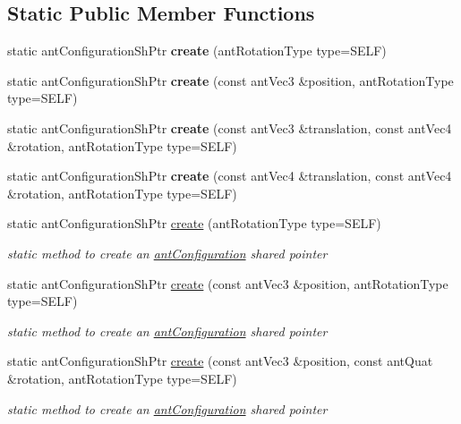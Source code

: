 \subsection*{Static Public Member Functions}
\begin{DoxyCompactItemize}
\item 
\hypertarget{classant_configuration_a50a63e51ad01a040c130b9e729b1f47b}{static ant\+Configuration\+Sh\+Ptr {\bfseries create} (ant\+Rotation\+Type type=S\+E\+L\+F)}\label{classant_configuration_a50a63e51ad01a040c130b9e729b1f47b}

\item 
\hypertarget{classant_configuration_a0ffe99d2bf7c8fdd277d7e998d7bee94}{static ant\+Configuration\+Sh\+Ptr {\bfseries create} (const ant\+Vec3 \&position, ant\+Rotation\+Type type=S\+E\+L\+F)}\label{classant_configuration_a0ffe99d2bf7c8fdd277d7e998d7bee94}

\item 
\hypertarget{classant_configuration_aaab20d8f569c22e8f77ab083bdb152af}{static ant\+Configuration\+Sh\+Ptr {\bfseries create} (const ant\+Vec3 \&translation, const ant\+Vec4 \&rotation, ant\+Rotation\+Type type=S\+E\+L\+F)}\label{classant_configuration_aaab20d8f569c22e8f77ab083bdb152af}

\item 
\hypertarget{classant_configuration_a057b918aded0c08ddabc49fb93ef44bf}{static ant\+Configuration\+Sh\+Ptr {\bfseries create} (const ant\+Vec4 \&translation, const ant\+Vec4 \&rotation, ant\+Rotation\+Type type=S\+E\+L\+F)}\label{classant_configuration_a057b918aded0c08ddabc49fb93ef44bf}

\item 
static ant\+Configuration\+Sh\+Ptr \hyperlink{classant_configuration_a50a63e51ad01a040c130b9e729b1f47b}{create} (ant\+Rotation\+Type type=S\+E\+L\+F)
\begin{DoxyCompactList}\small\item\em static method to create an \hyperlink{classant_configuration}{ant\+Configuration} shared pointer \end{DoxyCompactList}\item 
static ant\+Configuration\+Sh\+Ptr \hyperlink{classant_configuration_a0ffe99d2bf7c8fdd277d7e998d7bee94}{create} (const ant\+Vec3 \&position, ant\+Rotation\+Type type=S\+E\+L\+F)
\begin{DoxyCompactList}\small\item\em static method to create an \hyperlink{classant_configuration}{ant\+Configuration} shared pointer \end{DoxyCompactList}\item 
static ant\+Configuration\+Sh\+Ptr \hyperlink{classant_configuration_afbf6332e0d156c20191e012d9c8d3d7c}{create} (const ant\+Vec3 \&position, const ant\+Quat \&rotation, ant\+Rotation\+Type type=S\+E\+L\+F)
\begin{DoxyCompactList}\small\item\em static method to create an \hyperlink{classant_configuration}{ant\+Configuration} shared pointer \end{DoxyCompactList}\end{DoxyCompactItemize}
